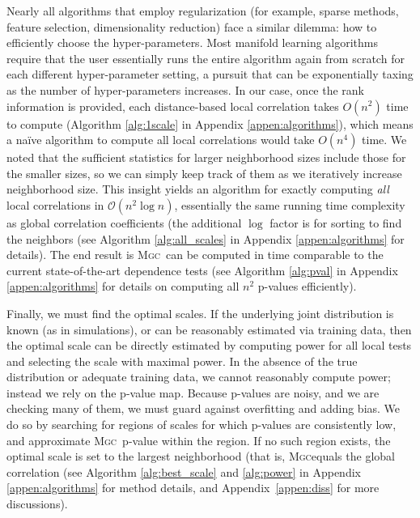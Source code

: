 \documentclass[11pt]{article}
\providecommand{\sct}[1]{{\normalfont\textsc{#1}}}
\providecommand{\mc}[1]{\mathcal{#1}}
\newcommand{\Mgc}{\sct{Mgc}}
\begin{document}
Nearly all algorithms that employ regularization (for example, sparse methods, feature selection, dimensionality reduction) face a similar dilemma: how to efficiently choose the hyper-parameters.
% 
Most manifold learning algorithms require that the user essentially runs the entire algorithm again from scratch for each different hyper-parameter setting, a pursuit that can be exponentially taxing as the number of hyper-parameters increases.
In our case, once the rank information is provided, each distance-based local correlation takes $O(n^2)$ time to compute (Algorithm \ref{alg:1scale} in Appendix \ref{appen:algorithms}), which means a na\"ive algorithm to compute all local correlations would take $O(n^4)$ time.
% 
We noted that the sufficient statistics for larger neighborhood sizes include those for the smaller sizes, so we can simply keep track of them as we iteratively increase neighborhood size. 
This insight yields an algorithm for exactly computing \emph{all} local correlations in $\mc{O}(n^2 \log n)$, essentially the same running time complexity as  global correlation coefficients (the additional $\log$ factor is for sorting to find the neighbors  (see Algorithm \ref{alg:all_scales} in Appendix \ref{appen:algorithms} for details). 
The end result is \Mgc~can be computed in  time comparable to the current state-of-the-art dependence tests (see Algorithm \ref{alg:pval} in Appendix \ref{appen:algorithms} for details on computing all $n^2$ p-values efficiently).
% 

Finally, we must find the optimal scales. If the underlying joint distribution is known (as in simulations), or can be reasonably estimated via training data, then the optimal scale can be directly estimated by computing power for all local tests and selecting the scale with maximal power. In the absence of the true distribution or adequate training data, we cannot reasonably compute power; instead we rely on the p-value map.  Because p-values are noisy, and we are checking many of them, we must guard against overfitting and adding bias.  We do so by searching for  regions of scales for which p-values are consistently low, and approximate \Mgc~p-value within the region. If no such region exists, the optimal scale is set to the largest neighborhood (that is, \Mgc equals the global correlation 
(see Algorithm \ref{alg:best_scale} and \ref{alg:power} in Appendix \ref{appen:algorithms} for method details, and Appendix~\ref{appen:diss} for more discussions).
\end{document}
